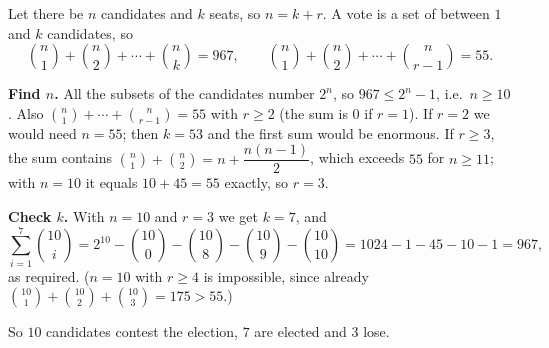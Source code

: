 Let there be $n$ candidates and $k$ seats, so $n=k+r$. A vote is a set of between $1$ and $k$ candidates, so
\[
\binom n1+\binom n2+\cdots+\binom nk=967,\qquad \binom n1+\binom n2+\cdots+\binom n{r-1}=55 .
\]

\textbf{Find $n$.} All the subsets of the candidates number $2^n$, so $967\le2^n-1$, i.e.\ $n\ge10$. Also $\binom n1+\cdots+\binom n{r-1}=55$ with $r\ge2$ (the sum is $0$ if $r=1$). If $r=2$ we would need $n=55$; then $k=53$ and the first sum would be enormous. If $r\ge3$, the sum contains $\binom n1+\binom n2=n+\dfrac{n(n-1)}{2}$, which exceeds $55$ for $n\ge11$; with $n=10$ it equals $10+45=55$ exactly, so $r=3$.

\textbf{Check $k$.} With $n=10$ and $r=3$ we get $k=7$, and
\[
\sum_{i=1}^{7}\binom{10}{i}=2^{10}-\binom{10}{0}-\binom{10}{8}-\binom{10}{9}-\binom{10}{10}=1024-1-45-10-1=967 ,
\]
as required. ($n=10$ with $r\ge4$ is impossible, since already $\binom{10}1+\binom{10}2+\binom{10}3=175>55$.)

So $\boxed{10}$ candidates contest the election, $7$ are elected and $\boxed{3}$ lose.
